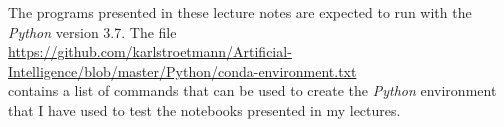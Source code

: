 \remark
The programs presented in these lecture notes are expected to run with the \textsl{Python} version 3.7.
The file 
\\[0.2cm]
\hspace*{-0.3cm}
\href{https://github.com/karlstroetmann/Artificial-Intelligence/blob/master/Python/conda-environment.txt}{https://github.com/karlstroetmann/Artificial-Intelligence/blob/master/Python/conda-environment.txt}
\\[0.2cm]
contains a list of commands that can be used to create the \textsl{Python} environment that I have used to test
the notebooks presented in my lectures.  

